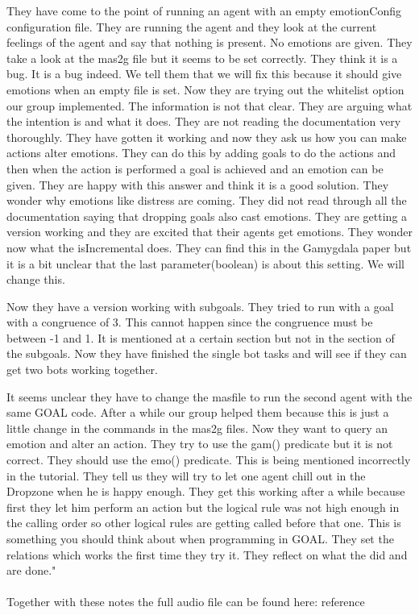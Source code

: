 \documentclass[11pt]{article}
\begin{document}
\begin{appendices}
	They have come to the point of running an agent with an empty emotionConfig configuration file. They are running the agent and they look at the current feelings of the agent and say that nothing is present. No emotions are given. They take a look at the mas2g file but it seems to be set correctly. They think it is a bug. It is a bug indeed. We tell them that we will fix this because it should give emotions when an empty file is set. Now they are trying out the whitelist option our group implemented. The information is not that clear. They are arguing what the intention is and what it does. They are not reading the documentation very thoroughly. They have gotten it working and now they ask us how you can make actions alter emotions. They can do this by adding goals to do the actions and then when the action is performed a goal is achieved and an emotion can be given. They are happy with this answer and think it is a good solution. They wonder why emotions like distress are coming. They did not read through all the documentation saying that dropping goals also cast emotions. They are getting a version working and they are excited that their agents get emotions. They wonder now what the isIncremental does. They can find this in the Gamygdala paper but it is a bit unclear that the last parameter(boolean) is about this setting. We will change this. \par Now they have a version working with subgoals. They tried to run with a goal with a congruence of 3. This cannot happen since the congruence must be between -1 and 1. It is mentioned at a certain section but not in the section of the subgoals. Now they have finished the single bot tasks and will see if they can get two bots working together.\par It seems unclear they have to change the masfile to run the second agent with the same GOAL code. After a while our group helped them because this is just a little change in the commands in the mas2g files. Now they want to query an emotion and alter an action. They try to use the gam() predicate but it is not correct. They should use the emo() predicate. This is being mentioned incorrectly in the tutorial. They tell us they will try to let one agent chill out in the Dropzone when he is happy enough. They get this working after a while because first they let him perform an action but the logical rule was not high enough in the calling order so other logical rules are getting called before that one. This is something you should think about when programming in GOAL. They set the relations which works the first time they try it. They reflect on what the did and are done."\\
	\\
	Together with these notes the full audio file can be found here:
	reference
\end{appendices}
\end{document}
